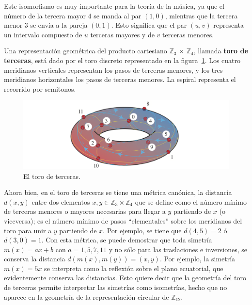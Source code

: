 \documentclass[letterpaper,12pt]{book}
\theoremstyle{definition} \newtheorem{Def}{Definición}[chapter]
\theoremstyle{definition} \newtheorem{Teo}{Teorema}[chapter]
\theoremstyle{definition} \newtheorem{Pro}{Proposición}[chapter]
\theoremstyle{definition} \newtheorem{Lema}{Lema}[chapter]
\begin{document}
 Este isomorfismo es muy importante para la teoría de la música, ya que el número de la tercera mayor $4$ se manda al par $(1,0)$, mientras que la tercera menor $3$ se envía a la pareja $(0,1)$. Esto significa que el par $(u,v)$ representa un intervalo compuesto de $u$ terceras mayores y de $v$ terceras menores.
 
 Una representación geométrica del producto cartesiano $\mathbb{Z}_{3}$ $\times$ $\mathbb{Z}_{4}$, llamada \textbf{toro de terceras}, está dado por el toro discreto representado en la figura~\ref{Toro}. Los cuatro meridianos verticales representan los pasos de terceras menores, y los tres meridianos horizontales los pasos de terceras menores. La espiral representa el recorrido por semitonos.
 
\begin{figure}[h]
\centering
\includegraphics[angle=0, width=1\textwidth]{ToroColor.png}
\caption{\label{Toro}El toro de terceras.}
\end{figure}
 
 Ahora bien, en el toro de terceras se tiene una métrica canónica, la distancia $d(x,y)$ entre dos elementos $x,y \in \mathbb{Z}_{3} \times \mathbb{Z}_{4}$ que se define como el número mínimo de terceras menores o mayores necesarias para llegar a $y$ partiendo de $x$ (o viceversa); es el número mínimo de pasos ``elementales'' sobre los meridianos del toro para unir a $y$ partiendo de $x$. Por ejemplo, se tiene que $d(4,5)=2$ ó $d(3,0)=1$. Con esta métrica, se puede demostrar que toda simetría $m(x)=ax+b$ con $a=1,5,7,11$ y no sólo para las traslaciones e inversiones, se conserva la distancia $d(m(x),m(y))=(x,y)$. Por ejemplo, la simetría $m(x)=5x$ se interpreta como la reflexión sobre el plano ecuatorial, que evidentemente conserva las distancias. Esto quiere decir que la geometría del toro de terceras permite interpretar las simetrías como isometrías, hecho que no aparece en la geometría de la representación circular de $\mathbb{Z}_{12}$. 
\end{document}
